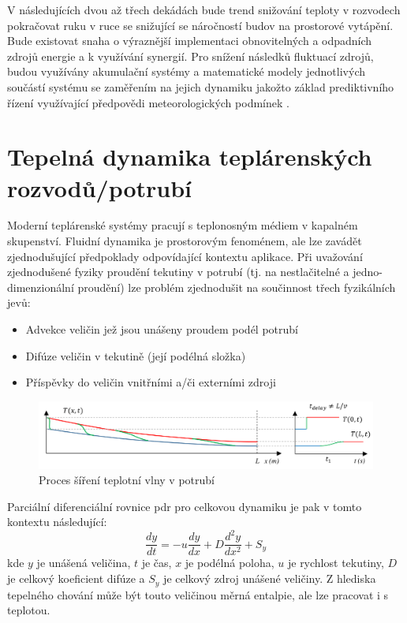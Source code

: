 V následujících dvou až třech dekádách bude trend snižování teploty v
rozvodech pokračovat ruku v ruce se snižující se náročností budov na prostorové
vytápění. Bude existovat snaha o výraznější implementaci obnovitelných a
odpadních zdrojů energie a k využívání synergií. Pro snížení následků fluktuací
zdrojů, budou využívány akumulační systémy a matematické modely jednotlivých
součástí systému se zaměřením na jejich dynamiku jakožto základ prediktivního
řízení využívající předpovědi meteorologických podmínek \cite{Lund2014}.

\section{Tepelná dynamika teplárenských rozvodů/potrubí}
\label{sec:HeatDynamics}
Moderní teplárenské systémy pracují s teplonosným médiem v kapalném skupenství.
Fluidní dynamika je prostorovým fenoménem, ale lze zavádět zjednodušující
předpoklady odpovídající kontextu aplikace. Při uvažování zjednodušené fyziky
proudění tekutiny v potrubí (tj. na nestlačitelné a jedno-dimenzionální
proudění) lze problém zjednodušit na součinnost třech fyzikálních jevů:

\begin{itemize}
  \item Advekce veličin jež jsou unášeny proudem podél potrubí
  \item Difúze veličin v tekutině (její podélná složka)
  \item Příspěvky do veličin vnitřními a/či externími zdroji
\end{itemize}

\begin{figure}[h] \capstart
  \label{fig:heatwave}
  \includegraphics[width=\textwidth]{figures/heat_front}
  \caption{Proces šíření teplotní vlny v potrubí}
\end{figure}
Parciální diferenciální rovnice \acrshort{pdr} pro celkovou dynamiku je pak v tomto
kontextu následující:
\begin{equation}
  \label{eq:AdvDiff}
  \frac{dy}{dt} = -u \frac{dy}{dx} + D\frac{d^{2}y}{dx^2} + {S_y}
\end{equation}
kde \(y\) je unášená veličina, \(t\) je čas, \(x\) je podélná poloha, \(u\) je
rychlost tekutiny, \(D\) je celkový koeficient difúze a \(S_y\) je celkový
zdroj unášené veličiny. Z hlediska tepelného chování může být touto veličinou
měrná entalpie, ale lze pracovat i s teplotou.

